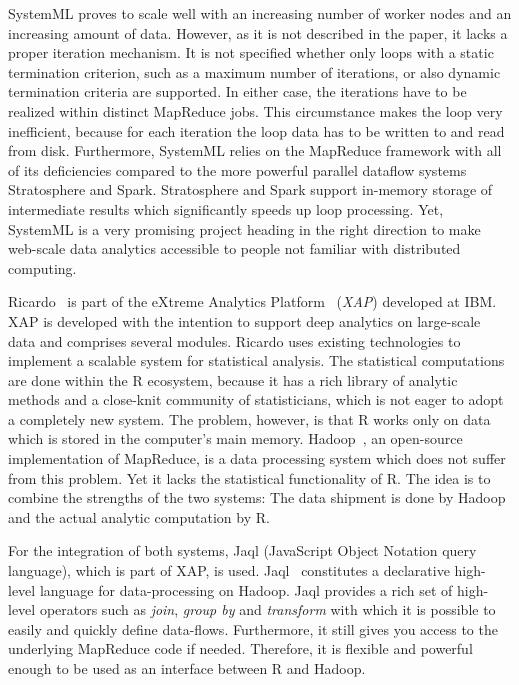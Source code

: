 SystemML proves to scale well with an increasing number of worker nodes and an increasing amount of data.
However, as it is not described in the paper, it lacks a proper iteration mechanism.
It is not specified whether only loops with a static termination criterion, such as a maximum number of iterations, or also dynamic termination criteria are supported.
In either case, the iterations have to be realized within distinct MapReduce jobs.
This circumstance makes the loop very inefficient, because for each iteration the loop data has to be written to and read from disk.
Furthermore, SystemML relies on the MapReduce framework with all of its deficiencies compared to the more powerful parallel dataflow systems Stratosphere and Spark.
Stratosphere and Spark support in-memory storage of intermediate results which significantly speeds up loop processing.
Yet, SystemML is a very promising project heading in the right direction to make web-scale data analytics accessible to people not familiar with distributed computing.

Ricardo~\cite{das:2010a} is part of the eXtreme Analytics Platform~\cite{balmin:jrd2013a} (\emph{XAP}) developed at IBM.
XAP is developed with the intention to support deep analytics on large-scale data and comprises several modules.
Ricardo uses existing technologies to implement a scalable system for statistical analysis.
The statistical computations are done within the R ecosystem, because it has a rich library of analytic methods and a close-knit community of statisticians, which is not eager to adopt a completely new system.
The problem, however, is that R works only on data which is stored in the computer's main memory.
Hadoop~\cite{hadoop:2008a}, an open-source implementation of MapReduce, is a data processing system which does not suffer from this problem.
Yet it lacks the statistical functionality of R.
The idea is to combine the strengths of the two systems: The data shipment is done by Hadoop and the actual analytic computation by R.

For the integration of both systems, Jaql (JavaScript Object Notation query language), which is part of XAP, is used.
Jaql~\cite{beyer:2011a} constitutes a declarative high-level language for data-processing on Hadoop.
Jaql provides a rich set of high-level operators such as \emph{join}, \emph{group by} and \emph{transform} with which it is possible to easily and quickly define data-flows.
Furthermore, it still gives you access to the underlying MapReduce code if needed.
Therefore, it is flexible and powerful enough to be used as an interface between R and Hadoop.

